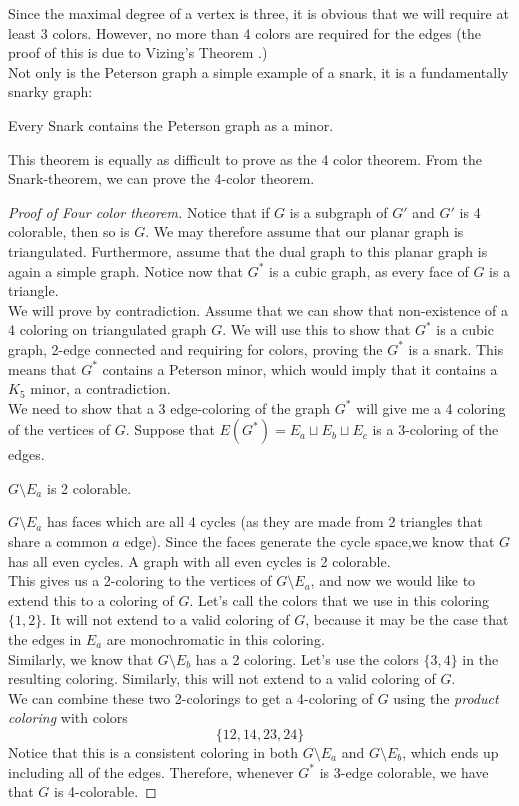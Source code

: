 Since the maximal degree of a vertex is three, it is obvious that we will require at least 3 colors. However, no more than 4 colors are required for the edges (the proof of this is due to Vizing's Theorem \cite{vizing1964estimate}.) \\
Not only is the Peterson graph a simple example of a snark, it is a fundamentally snarky graph:
\begin{theorem}
 Every Snark contains the Peterson graph as a minor. 
\end{theorem}
This theorem is equally as difficult to prove as the 4 color theorem. From the Snark-theorem, we can prove the 4-color theorem.
\begin{proof}[Proof of Four color theorem]
  Notice that if $G$ is a subgraph of $G'$ and $G'$ is 4 colorable, then so is $G$. We may therefore assume that our planar graph is triangulated. Furthermore, assume that the dual graph to this planar graph is again a simple graph. Notice now that $G^*$ is a cubic graph, as every face of $G$ is a triangle.\\
  We will prove by contradiction. Assume that we can show that non-existence of a 4 coloring on triangulated graph $G$. We will use this to show that $G^*$ is a cubic graph, 2-edge connected and requiring for colors, proving the $G^*$ is a snark. This means that $G^*$ contains a Peterson minor, which would imply that it contains a $K_{5}$ minor, a contradiction.  \\
   We need to show that a 3 edge-coloring of the graph $G^*$ will give me a 4 coloring of the vertices of $G$. Suppose that $E(G^*)=E_a\sqcup E_b \sqcup E_c$ is a 3-coloring of the edges.
\begin{lemma}
$G\setminus E_a$ is 2 colorable.
\end{lemma}
$G\setminus E_a$ has faces which are all 4 cycles (as they are made from 2 triangles that share a common $a$ edge). Since the faces generate the cycle space,we know that $G$ has all  even cycles. A graph with all even cycles is 2 colorable. \\
This gives us a 2-coloring to the vertices of $G\setminus E_a$, and now we would like to extend this to a coloring of $G$. Let's call the colors that we use in this coloring $\{1,2\}$. It will not extend to a valid coloring of $G$, because it may be the case that the edges in $E_a$ are monochromatic in this coloring. \\
Similarly, we know that $G\setminus E_b$ has a 2 coloring. Let's use the colors $\{3, 4\}$ in the resulting coloring. Similarly, this will not extend to a valid coloring of $G$. \\
We can combine these two 2-colorings to get a 4-coloring of $G$ using the \emph{product coloring} with colors 
\[\{12,14,23,24\}\]
Notice that this is a consistent coloring in both $G\setminus E_a$ and $G\setminus E_b$, which ends up including all of the edges. Therefore, whenever $G^*$ is 3-edge colorable, we have that $G$ is 4-colorable. 
\end{proof}
